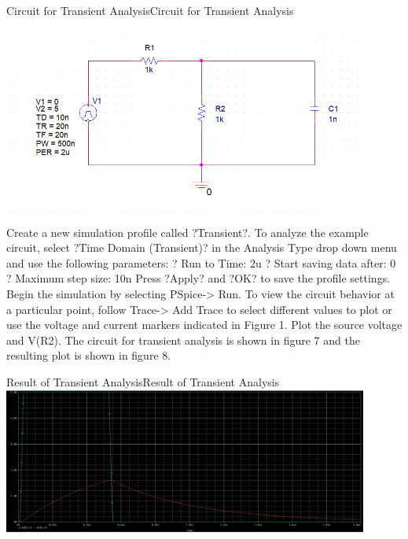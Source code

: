 \documentclass[12pt]{../manual}
\begin{document}
\begin{myfigure}[colback=white,label=fig:trans]{Circuit for Transient Analysis}{Circuit for Transient Analysis}
\centering
\includegraphics[width=0.9\textwidth]{figures/TransientAnalysisCircuitCrop.PNG}
\end{myfigure}


Create a new simulation profile called ?Transient?. To analyze the example circuit, select ?Time Domain (Transient)? in the Analysis Type drop down menu and use the following parameters:
? Run to Time: 2u
? Start saving data after: 0
? Maximum step size: 10n
Press ?Apply? and ?OK? to save the profile settings. Begin the simulation by selecting PSpice-> Run. To view the circuit behavior at a particular point, follow Trace-> Add Trace to select different values to plot or use the voltage and current markers indicated in Figure 1. Plot the source voltage and V(R2). The circuit for transient analysis is shown in figure 7 and the resulting plot is shown in figure 8.

\begin{myfigure}[label=fig:transAnalRes]{Result of Transient Analysis}{Result of Transient Analysis}
\centering
\includegraphics[width=0.9\textwidth]{figures/ResultTransientAnalysisCrop.PNG}
\end{myfigure}
%
\end{document}
